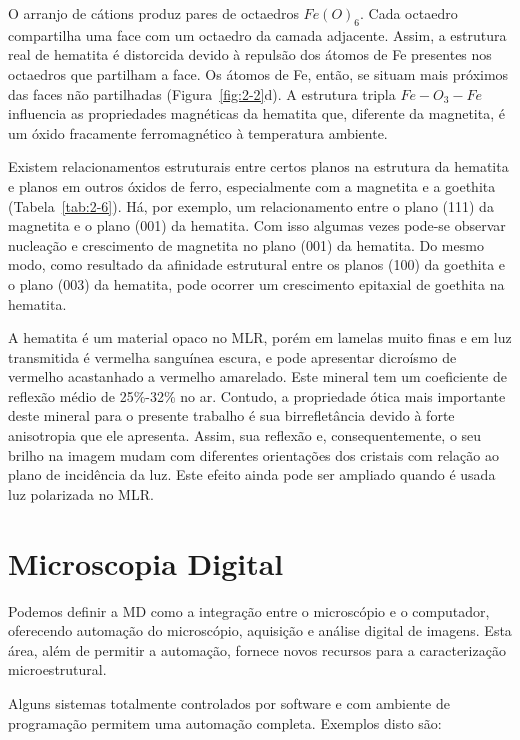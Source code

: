 O arranjo de cátions produz pares de octaedros $Fe(O)_{6}$. Cada
octaedro compartilha uma face com um octaedro da camada
adjacente. Assim, a estrutura real de hematita é distorcida devido à
repulsão dos átomos de Fe presentes nos octaedros que partilham a
face. Os átomos de Fe, então, se situam mais próximos das faces não
partilhadas (Figura~\ref{fig:2-2}d). A estrutura tripla $Fe-O_{3}-Fe$
influencia as propriedades magnéticas da hematita que, diferente da
magnetita, é um óxido fracamente ferromagnético à temperatura
ambiente.\cite{4,33}

Existem relacionamentos estruturais entre certos planos na estrutura
da hematita e planos em outros óxidos de ferro, especialmente com a
magnetita e a goethita (Tabela~\ref{tab:2-6}). Há, por exemplo, um
relacionamento entre o plano (111) da magnetita e o plano (001) da
hematita. Com isso algumas vezes pode-se observar nucleação e
crescimento de magnetita no plano (001) da hematita. Do mesmo modo,
como resultado da afinidade estrutural entre os planos (100) da
goethita e o plano (003) da hematita, pode ocorrer um crescimento
epitaxial de goethita na hematita.\cite{4}



A hematita é um material opaco no MLR, porém em lamelas muito finas e
em luz transmitida é vermelha sanguínea escura, e pode apresentar
dicroísmo de vermelho acastanhado a vermelho amarelado. Este mineral
tem um coeficiente de reflexão médio de 25\%-32\% no ar.\cite{34}
Contudo, a propriedade ótica mais importante deste mineral para o
presente trabalho é sua birrefletância devido à forte anisotropia que
ele apresenta. Assim, sua reflexão e, consequentemente, o seu brilho
na imagem mudam com diferentes orientações dos cristais com relação ao
plano de incidência da luz.\cite{5} Este efeito ainda pode ser
ampliado quando é usada luz polarizada no MLR.

\section{Microscopia Digital}

Podemos definir a MD como a integração entre o microscópio e o
computador, oferecendo automação do microscópio, aquisição e análise
digital de imagens. Esta área, além de permitir a automação, fornece
novos recursos para a caracterização microestrutural.\cite{35}

Alguns sistemas totalmente controlados por software e com ambiente de
programação permitem uma automação completa.\cite{36} Exemplos disto
são:

